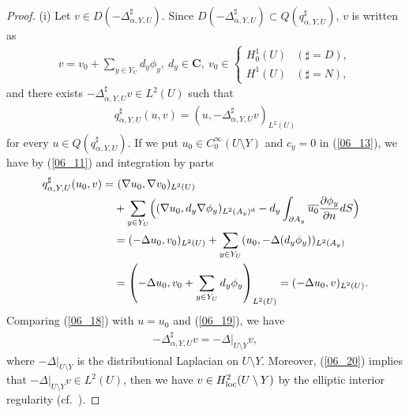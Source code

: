 \documentclass[12pt,a4paper]{article}
\begin{document}
\begin{proof}
(i) Let $v\in D(-\Delta^\sharp_{\alpha,Y,U})$.
Since $D(-\Delta^\sharp_{\alpha,Y,U})\subset
Q(q^\sharp_{\alpha,Y,U})$,
$v$ is written as
\begin{align*}
 v=v_0+\sum_{y\in Y_U}d_y\phi_y,\  
d_y\in \mathbf{C},\ 
v_0\in 
\begin{cases}
 H^1_0(U) & (\sharp=D),\\
 H^1(U) & (\sharp=N),
\end{cases}
\end{align*}
and there exists $-\Delta^\sharp_{\alpha,Y,U} v\in L^2(U)$ such that
\begin{align}
\label{06_18}
 q^\sharp_{\alpha,Y,U}(u,v)=(u,-\Delta^\sharp_{\alpha,Y,U} v)_{L^2(U)}
\end{align}
for every $u\in Q(q^\sharp_{\alpha,Y,U})$.
If we put $u_0\in C_0^\infty(U\setminus Y)$
and $c_y=0$ in (\ref{06_13}),
we have by (\ref{06_11}) and integration by parts
\begin{align}
q^\sharp_{\alpha,Y,U}(u_0,v)
=&\ 
(\nabla u_0,\nabla v_0)_{L^2(U)}\notag\\
&+
\sum_{y\in Y_U}
\Bigl(
(\nabla u_0,d_y \nabla \phi_y)_{L^2(A_y)^d}
-d_y\int_{\partial A_y}\overline{u_0}\frac{\partial \phi_y}{\partial n}dS
\Bigr)
\notag\\
&=(-\Delta u_0, v_0)_{L^2(U)}+
\sum_{y\in Y_U}(u_0, -\Delta(d_y\phi_y))_{L^2(A_y)}
\notag\\
&=
\left(-\Delta u_0,v_0+\sum_{y\in Y_U}d_y \phi_y\right)_{L^2(U)}
=
(-\Delta u_0,v)_{L^2(U)}.
\label{06_19}
\end{align}
Comparing (\ref{06_18}) with $u=u_0$ and (\ref{06_19}),
we have 
\begin{align}
 -\Delta^\sharp_{\alpha,Y,U}v= -\Delta|_{U\setminus Y}v,
\label{06_20}
\end{align}
where $-\Delta|_{U\setminus Y}$ is the distributional 
Laplacian on $U\setminus Y$.
Moreover, (\ref{06_20}) implies that
$-\Delta|_{U\setminus Y}v\in L^2(U)$,
then 
we have $v\in H^2_{\rm loc}(U\setminus Y)$
by the elliptic interior regularity (cf.\ \cite{Ag}).


\end{proof}
\end{document}

